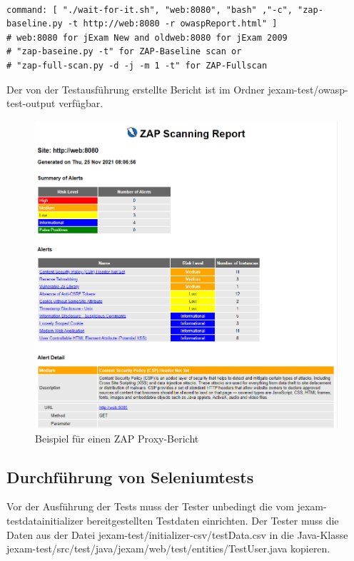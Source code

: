 \begin{lstlisting}[caption={docker-compose-penetration.yaml}]

command: [ "./wait-for-it.sh", "web:8080", "bash" ,"-c", "zap-baseline.py -t http://web:8080 -r owaspReport.html" ]
# web:8080 for jExam New and oldweb:8080 for jExam 2009
# "zap-baseine.py -t" for ZAP-Baseline scan or
# "zap-full-scan.py -d -j -m 1 -t" for ZAP-Fullscan
\end{lstlisting}

Der von der Testausführung erstellte Bericht ist
im Ordner jexam-test/owasp-test-output verfügbar.

\begin{figure}[H]
    \centering
    \includegraphics[scale=0.5]{images/zap-report}
    \caption{Beispiel für einen ZAP Proxy-Bericht} \label{fig:zap-report}
\end{figure}

\subsection{Durchführung von Seleniumtests}

Vor der Ausführung der Tests muss der Tester
unbedingt die vom jexam-testdatainitializer
bereitgestellten Testdaten einrichten. Der Tester
muss die Daten aus der
Datei jexam-test/initializer-csv/testData.csv in die
Java-Klasse
jexam-test/src/test/java/jexam/web/test/entities/TestUser.java
kopieren.

